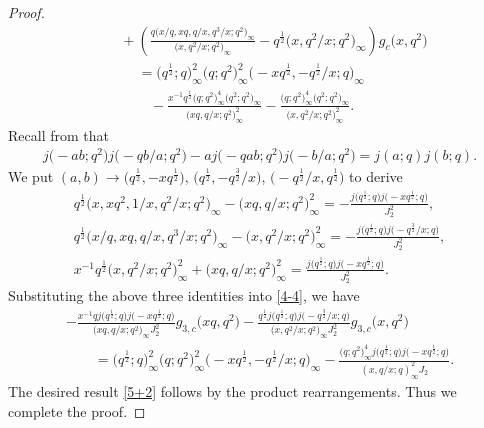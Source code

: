 \documentclass[10pt,a4paper]{amsart}
\numberwithin{equation}{section}
\begin{document}
\begin{proof}
\begin{gather}
\qquad+\left(\frac{q\bigl(x/q,xq,q/x,q^3/x;q^2\bigr)_{\infty}}
{\bigl(x,q^2/x;q^2\bigr)_{\infty}}
-q^{\frac{1}{2}}\bigl(x,q^2/x;q^2\bigr)_{\infty}\right)g_c\bigl(x,q^2\bigr)\nonumber\\
\phantom{\qquad+}{}=\bigl(q^{\frac{1}{2}};q\bigr)_{\infty}^2\bigl(q;q^2\bigr)_{\infty}^2
\bigl(-xq^{\frac{1}{2}},-q^{\frac{1}{2}}/x;q\bigr)_{\infty}\nonumber\\
\phantom{\qquad+=}{}-\frac{x^{-1}q^{\frac{1}{2}}\bigl(q;q^2\bigr)_{\infty}^4\bigl(q^2;q^2\bigr)_{\infty}}
{\bigl(xq,q/x;q^2\bigr)_{\infty}^2}
-\frac{\bigl(q;q^2\bigr)_{\infty}^4\bigl(q^2;q^2\bigr)_{\infty}}{\bigl(x,q^2/x;q^2\bigr)_{\infty}^2}. \label{4-4}
\end{gather}
Recall from \cite[equation~(2.4b)]{HM} that
\begin{align*}
j\bigl(-ab;q^2\bigr)j\bigl(-qb/a;q^2\bigr)-aj\bigl(-qab;q^2\bigr)j\bigl(-b/a;q^2\bigr)=j(a;q)j(b;q).
\end{align*}
We put $(a,b)\rightarrow \bigl(q^{\frac{1}{2}},-xq^{\frac{1}{2}}\bigr)$, $\bigl(q^{\frac{1}{2}},-q^{\frac{3}{2}}/x\bigr)$, $\bigl(-q^{\frac{1}{2}}/x,q^{\frac{1}{2}}\bigr)$ to derive
\begin{gather*}
q^{\frac{1}{2}}\bigl(x,xq^2,1/x,q^2/x;q^2\bigr)_{\infty}
-\bigl(xq,q/x;q^2\bigr)_{\infty}^2
=-\frac{j\bigl(q^{\frac{1}{2}};q\bigr)j\bigl(-xq^{\frac{1}{2}};q\bigr)}{J_2^2},\\
q^{\frac{1}{2}}\bigl(x/q,xq,q/x,q^3/x;q^2\bigr)_{\infty}
-\bigl(x,q^2/x;q^2\bigr)_{\infty}^2
=-\frac{j\bigl(q^{\frac{1}{2}};q\bigr)j\bigl(-q^{\frac{3}{2}}/x;q\bigr)}{J_2^2},\\
x^{-1}q^{\frac{1}{2}}\bigl(x,q^2/x;q^2\bigr)_{\infty}^2
+\bigl(xq,q/x;q^2\bigr)_{\infty}^2
=\frac{j\bigl(q^{\frac{1}{2}};q\bigr)j\bigl(-xq^{\frac{1}{2}};q\bigr)}{J_2^2}.
\end{gather*}
Substituting the above three identities into \eqref{4-4}, we have
\begin{gather*}
-\frac{x^{-1}qj\bigl(q^{\frac{1}{2}};q\bigr)j\bigl(-xq^{\frac{1}{2}};q\bigr)}
{\bigl(xq,q/x;q^2\bigr)_{\infty}J_2^2}g_{3,c}\bigl(xq,q^2\bigr)
-\frac{q^{\frac{1}{2}}j\bigl(q^{\frac{1}{2}};q\bigr)j\bigl(-q^{\frac{3}{2}}/x;q\bigr)}
{\bigl(x,q^2/x;q^2\bigr)_{\infty}J_2^2}g_{3,c}\bigl(x,q^2\bigr)\\
\qquad=\bigl(q^{\frac{1}{2}};q\bigr)_{\infty}^2\bigl(q;q^2\bigr)_{\infty}^2
\bigl(-xq^{\frac{1}{2}},-q^{\frac{1}{2}}/x;q\bigr)_{\infty}
-\frac{\bigl(q;q^2\bigr)_{\infty}^4j\bigl(q^{\frac{1}{2}};q\bigr)j\bigl(-xq^{\frac{1}{2}};q\bigr)}
{(x,q/x;q)_{\infty}^2J_2}.
\end{gather*}
The desired result \eqref{5+2} follows by the product rearrangements. Thus we complete the proof.
\end{proof}
\end{document}
